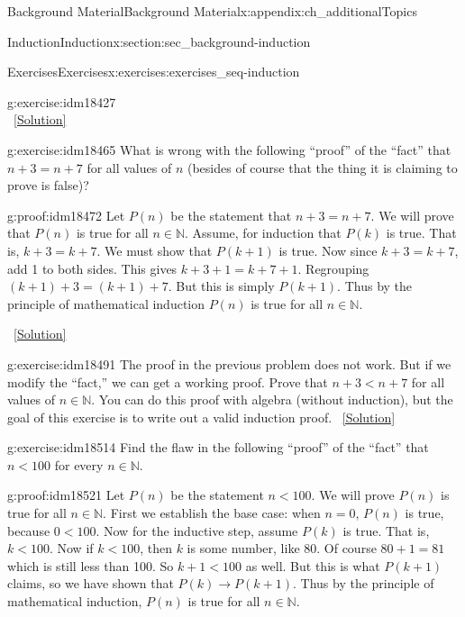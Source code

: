 \documentclass[oneside,10pt,]{book}
\numberwithin{equation}{chapter}
\def\N{\mathbb N}
\def\imp{\rightarrow}
\newcommand{\lt}{<}
\begin{document}
\begin{appendixptx}{Background Material}{}{Background Material}{}{}{x:appendix:ch_additionalTopics}
\begin{sectionptx}{Induction}{}{Induction}{}{}{x:section:sec_background-induction}
\begin{exercises-subsection}{Exercises}{}{Exercises}{}{}{x:exercises:exercises_seq-induction}
\begin{divisionexercise}{9}{}{}{g:exercise:idm18427}
\begin{equation*}
\end{equation*}
%
\qquad~\hfill{\tiny\hyperlink{g:solution:idm18432-main}{[Solution]}}\end{divisionexercise}%
\begin{divisionexercise}{10}{}{}{g:exercise:idm18465}%
What is wrong with the following ``proof'' of the ``fact'' that \(n+3 = n+7\) for all values of \(n\) (besides of course that the thing it is claiming to prove is false)?%
\begin{proofptx}{}{g:proof:idm18472}
Let \(P(n)\) be the statement that \(n + 3 = n + 7\). We will prove that \(P(n)\) is true for all \(n \in \N\). Assume, for induction that \(P(k)\) is true. That is, \(k+3 = k+7\). We must show that \(P(k+1)\) is true. Now since \(k + 3 = k + 7\), add 1 to both sides. This gives \(k + 3 + 1 = k + 7 + 1\). Regrouping \((k+1) + 3 = (k+1) + 7\). But this is simply \(P(k+1)\). Thus by the principle of mathematical induction \(P(n)\) is true for all \(n \in \N\).%
\end{proofptx}
\qquad~\hfill{\tiny\hyperlink{g:solution:idm18487-main}{[Solution]}}\end{divisionexercise}%
\begin{divisionexercise}{11}{}{}{g:exercise:idm18491}%
The proof in the previous problem does not work. But if we modify the ``fact,'' we can get a working proof. Prove that \(n + 3 \lt  n + 7\) for all values of \(n \in \N\). You can do this proof with algebra (without induction), but the goal of this exercise is to write out a valid induction proof.%
\qquad~\hfill{\tiny\hyperlink{g:solution:idm18497-main}{[Solution]}}\end{divisionexercise}%
\begin{divisionexercise}{12}{}{}{g:exercise:idm18514}%
Find the flaw in the following ``proof'' of the ``fact'' that \(n \lt  100\) for every \(n \in \N\).%
\begin{proofptx}{}{g:proof:idm18521}
Let \(P(n)\) be the statement \(n \lt  100\). We will prove \(P(n)\) is true for all \(n \in \N\). First we establish the base case: when \(n = 0\), \(P(n)\) is true, because \(0 \lt  100\). Now for the inductive step, assume \(P(k)\) is true. That is, \(k \lt  100\). Now if \(k \lt  100\), then \(k\) is some number, like 80. Of course \(80+1 = 81\) which is still less than 100. So \(k +1 \lt  100\) as well. But this is what \(P(k+1)\) claims, so we have shown that \(P(k) \imp P(k+1)\). Thus by the principle of mathematical induction, \(P(n)\) is true for all \(n \in \N\).%
\end{proofptx}

\end{divisionexercise}
\end{exercises-subsection}
\end{sectionptx}
\end{appendixptx}
\end{document}
